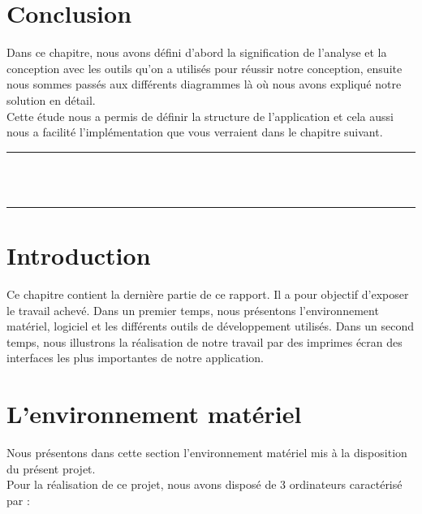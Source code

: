 \documentclass[12pt]{report}
\begin{document}
\newpage

\section{Conclusion}
\hspace*{0.16in}
Dans ce chapitre, nous avons défini d’abord la signification de l’analyse et la conception avec les outils qu’on a utilisés pour réussir notre conception, ensuite nous sommes passés aux différents diagrammes là où nous avons expliqué notre solution en détail. 
\\
\hspace*{0.16in}
Cette étude nous a permis de définir la structure de l’application et cela aussi nous a facilité l’implémentation que vous verraient dans le chapitre suivant.

\newpage

\vspace*{\fill}
\begin{center}
    {\color{Blue} \rule{\linewidth}{1.2mm} }\\
\vspace{0.25in}
    {\centering{}}
\vspace{0.35in}\\
    {\color{Blue} \rule{\linewidth}{1.2mm} }
\end{center}
\vspace*{\fill}
\setcounter{section}{0}

\newpage

\section{Introduction}
\vspace{0.2in}
\hspace*{0.16in}
Ce chapitre contient la dernière partie de ce rapport. Il a pour objectif d’exposer le travail achevé. Dans un premier temps, nous présentons l’environnement matériel, logiciel et les différents outils de développement utilisés. Dans un second temps, nous illustrons la réalisation de notre travail par des imprimes écran des interfaces les plus importantes de notre application.

\section{L’environnement matériel}
\vspace{0.1in}
\hspace*{0.16in}
Nous présentons dans cette section l’environnement matériel mis à la disposition du présent projet.
\\
Pour la réalisation de ce projet, nous avons disposé de 3 ordinateurs caractérisé par :
\end{document}
